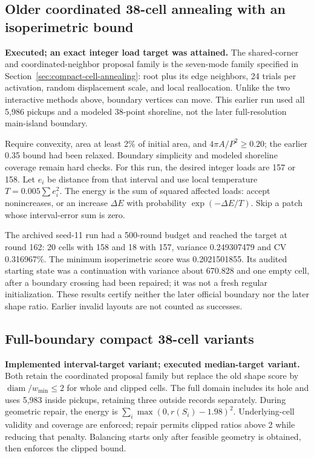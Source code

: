 \documentclass[11pt]{article}
\begin{document}
\subsection{Older coordinated 38-cell annealing with an isoperimetric bound}
\textbf{Executed; an exact integer load target was attained.}
The shared-corner and coordinated-neighbor proposal family is the seven-mode
family specified in Section~\ref{sec:compact-cell-annealing}: root plus its edge
neighbors, 24 trials per activation, random displacement scale, and local
reallocation. Unlike the two interactive methods above, boundary vertices can
move. This earlier run used all 5,986 pickups and a modeled 38-point shoreline,
not the later full-resolution main-island boundary.

Require convexity, area at least 2\% of initial area, and
$4\pi A/P^2\geq0.20$; the earlier 0.35 bound had been relaxed. Boundary simplicity
and modeled shoreline coverage remain hard checks. For this run, the desired
integer loads are 157 or 158. Let $e_i$ be distance from that interval and use
local temperature $T=0.005\sum e_i^2$. The energy is the sum of squared affected
loads: accept nonincreases, or an increase $\Delta E$ with probability
$\exp(-\Delta E/T)$. Skip a patch whose interval-error sum is zero.

The archived seed-11 run had a 500-round budget and reached the target at round
162: 20 cells with 158 and 18 with 157, variance 0.249307479 and CV 0.316967\%.
The minimum isoperimetric score was 0.2021501855. Its audited starting state was
a continuation with variance about 670.828 and one empty cell, after a boundary
crossing had been repaired; it was not a fresh regular initialization.
These results certify neither the later official boundary nor the later shape
ratio. Earlier invalid layouts are not counted as successes.

\subsection{Full-boundary compact 38-cell variants}
\textbf{Implemented interval-target variant; executed median-target variant.}
Both retain the coordinated proposal family but replace the old shape score by
$\operatorname{diam}/w_{\min}\leq2$ for whole and clipped cells. The full domain
includes its hole and uses 5,983 inside pickups, retaining three outside records
separately. During geometric repair, the energy is
$\sum_i\max(0,r(S_i)-1.98)^2$. Underlying-cell validity and coverage are enforced;
repair permits clipped ratios above 2 while reducing that penalty. Balancing
starts only after feasible geometry is obtained, then enforces the clipped bound.
\end{document}
